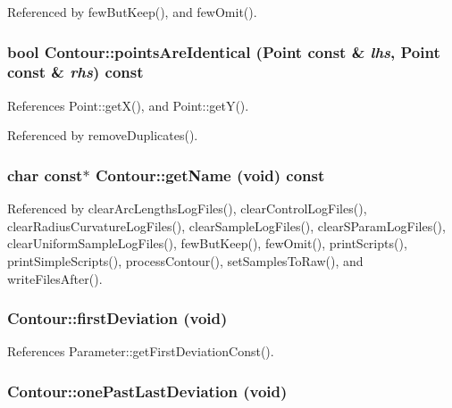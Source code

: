 Referenced by fewButKeep(), and fewOmit().\hypertarget{classContour_a29199e9ea18f0a4d58c94eca0cc62e3}{
\subsubsection[pointsAreIdentical]{\setlength{\rightskip}{0pt plus 5cm}bool Contour::pointsAreIdentical ({\bf Point} const \& {\em lhs}, \/  {\bf Point} const \& {\em rhs}) const}}
\label{classContour_a29199e9ea18f0a4d58c94eca0cc62e3}




References Point::getX(), and Point::getY().

Referenced by removeDuplicates().\hypertarget{classContour_0dbbcfa417bfde6a69069b2ac1376577}{
\subsubsection[getName]{\setlength{\rightskip}{0pt plus 5cm}char const$\ast$ Contour::getName (void) const}}
\label{classContour_0dbbcfa417bfde6a69069b2ac1376577}




Referenced by clearArcLengthsLogFiles(), clearControlLogFiles(), clearRadiusCurvatureLogFiles(), clearSampleLogFiles(), clearSParamLogFiles(), clearUniformSampleLogFiles(), fewButKeep(), fewOmit(), printScripts(), printSimpleScripts(), processContour(), setSamplesToRaw(), and writeFilesAfter().\hypertarget{classContour_dd1f35c151bb186952ca13ceba8d7e54}{
\subsubsection[firstDeviation]{ Contour::firstDeviation (void)}}
\label{classContour_dd1f35c151bb186952ca13ceba8d7e54}




References Parameter::getFirstDeviationConst().\hypertarget{classContour_62766dd4545b50f6698d9d858da50e04}{
\subsubsection[onePastLastDeviation]{ Contour::onePastLastDeviation (void)}}
\label{classContour_62766dd4545b50f6698d9d858da50e04}




